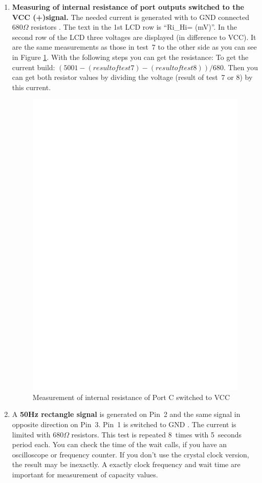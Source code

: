 \begin{enumerate}
\item {\bf Measuring of internal resistance of port outputs switched to the VCC (+)signal.}
The needed current is generated with to GND connected \(680\Omega\) resistors .
The text in the 1st LCD row is ``Ri\_Hi= (mV)''. In the second row of the LCD three voltages are displayed (in difference to VCC).
It are the same measurements as those in test~7 to the other side as you can see in Figure \ref{fig:test8}.
With the following steps you can get the resistance:
To get the current build:  \((5001 - (result of test 7) - (result of test 8)) / 680\).
Then you can get both resistor values by dividing the voltage (result of test~7 or 8) by this current.
\begin{figure}[H]
\centering
\includegraphics[]{../FIG/Test8.eps}
\caption{Measurement of internal resistance of Port C switched to VCC }
\label{fig:test8}
\end{figure}

\item A {\bf 50Hz rectangle signal} is generated on Pin~2 and  the same signal in opposite direction on Pin~3.
Pin~1 is switched to GND . The current is limited with \(680\Omega\) resistors.
This test is repeated 8~times with 5~seconds period each.
You can check the time of the wait calls, if you have an oscilloscope or frequency counter.
If you don't use the crystal clock version, the result may be inexactly.
A exactly clock frequency and wait time are important for measurement of capacity values.

\end{enumerate}

